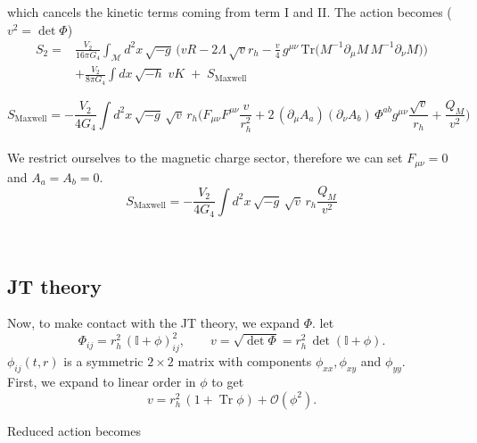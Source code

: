 \documentclass[a4paper,11pt]{article}
\DeclareMathOperator{\Tr}{Tr}
\begin{document}
which cancels the kinetic terms coming from term I and II. The action becomes ($v^2= \det \Phi$)
\begin{equation}
\begin{aligned}
S_2=&\frac{V_2}{16\pi G_4}\int_{\mathcal M} d^2x\,\sqrt{-g}\,\Big(v R-2 \Lambda\,\sqrt{v} r_h
-\frac{v}{4}\,g^{\mu\nu}\,\text{Tr}\!\big(M^{-1}\partial_\mu M\,M^{-1}\partial_\nu M\big)\Big)\\
&+\frac{V_2}{8\pi G_4}\int dx\,\sqrt{-h}\;vK\;+\;S_{\text{Maxwell}}
\end{aligned}
\label{eq:KK-S2}
\end{equation}

\begin{equation}
S_{\text{Maxwell}}=-\frac{V_2}{4G_4}\int d^2x\,\sqrt{-g}\,\sqrt{v}\,r_h\Big(F_{\mu\nu}F^{\mu\nu}\frac{v}{r_h^2}
+2\,(\partial_\mu A_a)(\partial_\nu A_b)\,\Phi^{ab}g^{\mu\nu}\frac{\sqrt{v}}{r_h} + \frac{Q_M}{v^2} )
\label{eq:Maxwell}
\end{equation}
\\
We restrict ourselves to the magnetic charge sector, therefore we can set $F_{\mu \nu}=0$ and $A_a=A_b=0$. \\

\begin{equation}\label{Eq: Maxwell}
S_{\text{Maxwell}}=-\frac{V_2}{4G_4}\int d^2x\,\sqrt{-g}\,\sqrt{v}\,r_h \frac{Q_M}{v^2}
\end{equation}

\\
\subsection{JT theory}
Now, to make contact with the JT theory, we expand $\Phi$. let
\begin{equation}
\Phi_{ij}=r_h^2\,(\mathbb{I}+\phi)^2_{ij},\qquad
v=\sqrt{\det\Phi}=r_h^2\,\det{}(\mathbb{I}+\phi).
\label{eq:KK-Phi-phi}
\end{equation}
 $\phi_{ij}(t,r)$ is a symmetric $2\times2$ matrix with components
$\phi_{xx},\phi_{xy}$  and $\phi_{yy}$.\\

First, we expand to linear order in $\phi$ to get
\begin{equation}
v=r_h^2\,(1+\Tr \phi)+\mathcal O(\phi^2).
\label{eq:KK-v-lin}
\end{equation}


Reduced action becomes
\end{document}

